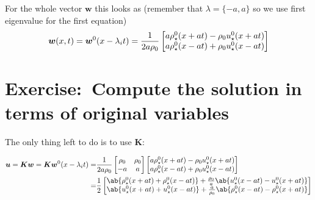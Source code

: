 \documentclass[justified, nobib,a4paper]{tufte-handout}
\newcommand{\Q}[1]{\section{Exercise:~{#1}}}
\begin{document}
For the whole vector $\bm{w}$ this looks as (remember that $\lambda = \{-a, a\}$ so we use first eigenvalue for the first equation)
\[
	\bm{w}(x, t) = \bm{w}^0(x - \lambda_i t) =
	\frac{1}{2a\rho_0}
	\begin{bmatrix}
		a \rho_\star^0(x + at) -\rho_0u_\star^0(x + at) \\
		a \rho_\star^0(x - at) + \rho_0u_\star^0 (x - at)
	\end{bmatrix}
\]
\Q{Compute the solution in terms of original variables}
The only thing left to do is to use $\bm{K}$:
\begin{fullwidth}
	\begin{equation*}
		\begin{split}
			\bm{u} = \bm{K}\bm{w} = \bm{K}\bm{w}^0(x - \lambda_i t) = &
			\frac{1}{2a\rz}
			\begin{bmatrix}
				\rz & \rz \\
				-a  & a
			\end{bmatrix}
			\begin{bmatrix}
				a \rs^0(x + at) -\rz\us^0(x + at) \\
				a \rs^0(x - at) + \rz\us^0 (x - at)
			\end{bmatrix}                          \\
			=                                                         &
			\frac{1}{2}
			\begin{bmatrix}
				\ab\{\rs^0(x + at) + \rs^0(x - at) \} + \frac{\rz}{a}\ab\{\us^0 (x - at) -\us^0(x + at)\} \\
				\ab\{\us^0(x + at)  + \us^0 (x - at)\} + \frac{a}{\rz} \ab\{\rs^0(x - at)- \rs^0(x + at)\}
			\end{bmatrix}
		\end{split}
	\end{equation*}
\end{fullwidth}
\end{document}
